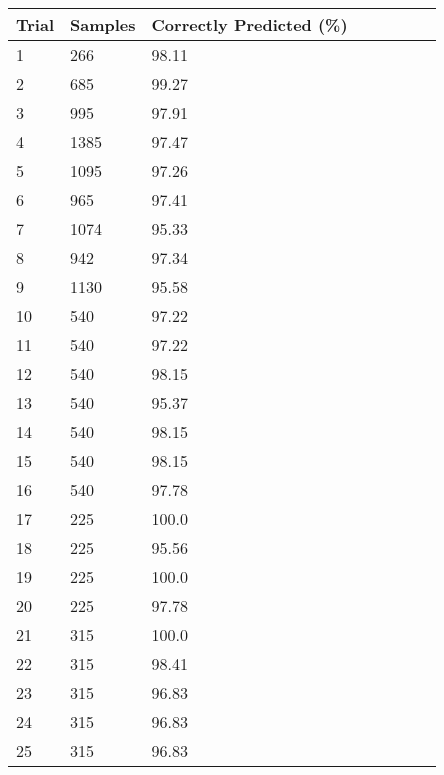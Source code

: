 \begin{center}
\begin{table}[t!]
   \centering
   \begin{tabular}{|l|l|l|l|l|l|l|l|}
      \hline
      \bf Trial & \bf Samples & \bf Correctly Predicted (\%) \\
      \hline
      1 & 266 & 98.11 \\ %
      \hline
      2 & 685 & 99.27 \\ %
      \hline
      3 & 995 & 97.91 \\ %
      \hline
      4 & 1385 & 97.47 \\ %
      \hline
      5 & 1095 & 97.26 \\ %
      \hline
      6 & 965 & 97.41 \\ %
      \hline
      7 & 1074 & 95.33 \\ %
      \hline
      8 & 942 & 97.34 \\ %
      \hline
      9 & 1130 & 95.58 \\ %
      \hline
      10 & 540 & 97.22 \\ %
      \hline
      11 & 540 & 97.22 \\ %
      \hline
      12 & 540 & 98.15 \\ %
      \hline
      13 & 540 & 95.37 \\ %
      \hline
      14 & 540 & 98.15 \\ %
      \hline
      15 & 540 & 98.15 \\ %
      \hline
      16 & 540 & 97.78 \\ %
      \hline
      17 & 225 & 100.0 \\ %
      \hline
      18 & 225 & 95.56 \\ %
      \hline
      19 & 225 & 100.0 \\ %
      \hline
      20 & 225 & 97.78 \\ %
      \hline
      21 & 315 & 100.0 \\ %
      \hline
      22 & 315 & 98.41 \\ %
      \hline
      23 & 315 & 96.83 \\ %
      \hline
      24 & 315 & 96.83 \\ %
      \hline
      25 & 315 & 96.83 \\ %

\end{tabular}
\end{table}
\end{center}
